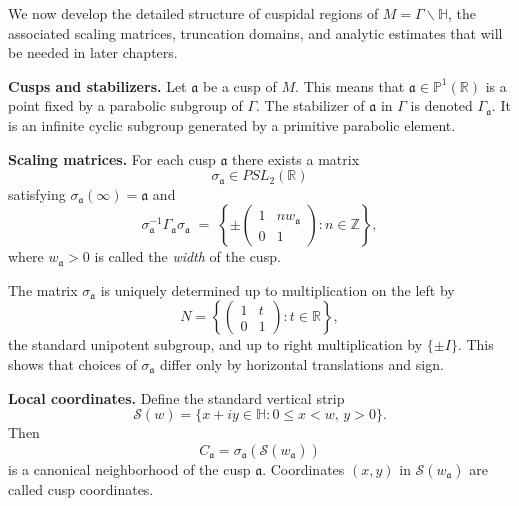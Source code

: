 
\noindent
We now develop the detailed structure of cuspidal regions of $M=\Gamma\backslash\mathbb{H}$,
the associated scaling matrices, truncation domains,
and analytic estimates that will be needed in later chapters.

\medskip

\noindent\textbf{Cusps and stabilizers.}
Let $\mathfrak{a}$ be a cusp of $M$.
This means that $\mathfrak{a}\in\mathbb{P}^{1}(\mathbb{R})$
is a point fixed by a parabolic subgroup of $\Gamma$.
The stabilizer of $\mathfrak{a}$ in $\Gamma$ is denoted $\Gamma_{\mathfrak{a}}$.
It is an infinite cyclic subgroup generated by a primitive parabolic element.

\medskip

\noindent\textbf{Scaling matrices.}
For each cusp $\mathfrak{a}$ there exists a matrix
\[
  \sigma_{\mathfrak{a}}\in PSL_{2}(\mathbb{R})
\]
satisfying $\sigma_{\mathfrak{a}}(\infty)=\mathfrak{a}$ and
\[
  \sigma_{\mathfrak{a}}^{-1}\Gamma_{\mathfrak{a}}\sigma_{\mathfrak{a}}
  \;=\;
  \left\{
    \pm
    \begin{pmatrix}
      1 & n w_{\mathfrak{a}} \\
      0 & 1
    \end{pmatrix}
    : n\in\mathbb{Z}
  \right\},
\]
where $w_{\mathfrak{a}}>0$ is called the \emph{width} of the cusp.

\medskip

\noindent
The matrix $\sigma_{\mathfrak{a}}$ is uniquely determined up to multiplication on the left by
\[
  N=\left\{
    \begin{pmatrix}
      1 & t \\
      0 & 1
    \end{pmatrix} : t\in\mathbb{R}
  \right\},
\]
the standard unipotent subgroup,
and up to right multiplication by $\{\pm I\}$.
This shows that choices of $\sigma_{\mathfrak{a}}$ differ only by horizontal translations and sign.

\medskip

\noindent\textbf{Local coordinates.}
Define the standard vertical strip
\[
  \mathcal{S}(w) = \{ x+iy \in \mathbb{H} : 0\le x < w, \, y>0 \}.
\]
Then
\[
  C_{\mathfrak{a}} = \sigma_{\mathfrak{a}}(\mathcal{S}(w_{\mathfrak{a}}))
\]
is a canonical neighborhood of the cusp $\mathfrak{a}$.
Coordinates $(x,y)$ in $\mathcal{S}(w_{\mathfrak{a}})$ are called cusp coordinates.

\medskip

